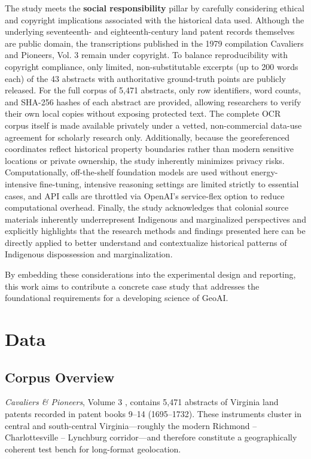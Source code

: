 The study meets the \textbf{social responsibility} pillar by carefully
considering ethical and copyright implications associated with the
historical data used. Although the underlying seventeenth- and
eighteenth-century land patent records themselves are public domain, the
transcriptions published in the 1979 compilation Cavaliers and Pioneers,
Vol. 3 remain under copyright. To balance reproducibility with copyright
compliance, only limited, non-substitutable excerpts (up to 200 words
each) of the 43 abstracts with authoritative ground-truth points are
publicly released. For the full corpus of 5,471 abstracts, only row
identifiers, word counts, and SHA-256 hashes of each abstract are
provided, allowing researchers to verify their own local copies without
exposing protected text. The complete OCR corpus itself is made
available privately under a vetted, non-commercial data-use agreement
for scholarly research only. Additionally, because the georeferenced
coordinates reflect historical property boundaries rather than modern
sensitive locations or private ownership, the study inherently minimizes
privacy risks. Computationally, off-the-shelf foundation models are used
without energy-intensive fine-tuning, intensive reasoning settings are
limited strictly to essential cases, and API calls are throttled via
OpenAI's service-flex option to reduce computational overhead. Finally,
the study acknowledges that colonial source materials inherently
underrepresent Indigenous and marginalized perspectives and explicitly
highlights that the research methods and findings presented here can be
directly applied to better understand and contextualize historical
patterns of Indigenous dispossession and marginalization.

By embedding these considerations into the experimental design and
reporting, this work aims to contribute a concrete case study that
addresses the foundational requirements for a developing science of
GeoAI.

\section{Data}\label{data}

\subsection{Corpus Overview}\label{corpus-overview}

\emph{Cavaliers \& Pioneers}, Volume 3 \citep{Nugent1979_cavaliers3},
contains 5,471 abstracts of Virginia land patents recorded in patent
books 9--14 (1695--1732). These instruments cluster in central and
south-central Virginia---roughly the modern Richmond -- Charlottesville
-- Lynchburg corridor---and therefore constitute a geographically
coherent test bench for long-format geolocation.


